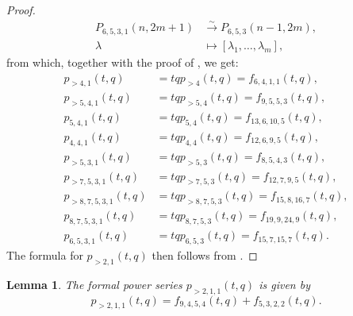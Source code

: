 \documentclass[a4paper, 12pt, reqno]{amsart}
\newtheorem{lemma}[theorem]{Lemma}
\theoremstyle{remark}
\begin{document}
\begin{proof}
  \begin{align*}
    P_{6, 5, 3, 1}(n, 2m + 1) &\xrightarrow{\sim} P_{6, 5, 3}(n - 1, 2m), \\
    \lambda &\mapsto [\lambda_1, \dots, \lambda_m],
  \end{align*}
  from which, together with the proof of , we get:
  \begin{align*}
    p_{>4, 1}(t, q) &= tqp_{>4}(t, q) = f_{6, 4, 1, 1}(t, q), \\
    p_{>5, 4, 1}(t, q) &= tqp_{>5, 4}(t, q) = f_{9, 5, 5, 3}(t, q), \\
    p_{5, 4, 1}(t, q) &= tqp_{5, 4}(t, q) = f_{13, 6, 10, 5}(t, q), \\
    p_{4, 4, 1}(t, q) &= tqp_{4, 4}(t, q) = f_{12, 6, 9, 5}(t, q), \\
    p_{>5, 3, 1}(t, q) &= tqp_{>5, 3}(t, q) = f_{8, 5, 4, 3}(t, q), \\
    p_{>7, 5, 3, 1}(t, q) &= tqp_{>7, 5, 3}(t, q) = f_{12, 7, 9, 5}(t, q), \\
    p_{>8, 7, 5, 3, 1}(t, q) &= tqp_{>8, 7, 5, 3}(t, q) = f_{15, 8, 16, 7}(t, q), \\
    p_{8, 7, 5, 3, 1}(t, q) &= tqp_{8, 7, 5, 3}(t, q) = f_{19, 9, 24, 9}(t, q), \\
    p_{6, 5, 3, 1}(t, q) &= tqp_{6, 5, 3}(t, q) = f_{15, 7, 15, 7}(t, q).
  \end{align*}
  The formula for $p_{>2, 1}(t, q)$ then follows from .
\end{proof}

\begin{lemma}
  \label{lmm:42}
  The formal power series $p_{>2, 1, 1}(t, q)$ is given by
  \begin{equation*}
    p_{>2, 1, 1}(t, q) = f_{9, 4, 5, 4}(t, q) + f_{5, 3, 2, 2}(t, q).
  \end{equation*}
\end{lemma}
\end{document}
